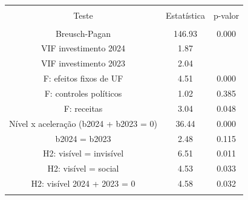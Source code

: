 
\begin{table}[!htbp] \centering 
  \caption{} 
  \label{} 
\begin{tabular}{@{\extracolsep{5pt}} ccc} 
\\[-1.8ex]\hline 
\hline \\[-1.8ex] 
Teste & Estatística & p-valor \\ 
\hline \\[-1.8ex] 
Breusch-Pagan & 146.93 & 0.000 \\ 
VIF investimento 2024 & 1.87 &  \\ 
VIF investimento 2023 & 2.04 &  \\ 
F: efeitos fixos de UF & 4.51 & 0.000 \\ 
F: controles políticos & 1.02 & 0.385 \\ 
F: receitas & 3.04 & 0.048 \\ 
Nível x aceleração (b2024 + b2023 = 0) & 36.44 & 0.000 \\ 
b2024 = b2023 & 2.48 & 0.115 \\ 
H2: visível = invisível & 6.51 & 0.011 \\ 
H2: visível = social & 4.53 & 0.033 \\ 
H2: visível 2024 + 2023 = 0 & 4.58 & 0.032 \\ 
\hline \\[-1.8ex] 
\end{tabular} 
\end{table} 
